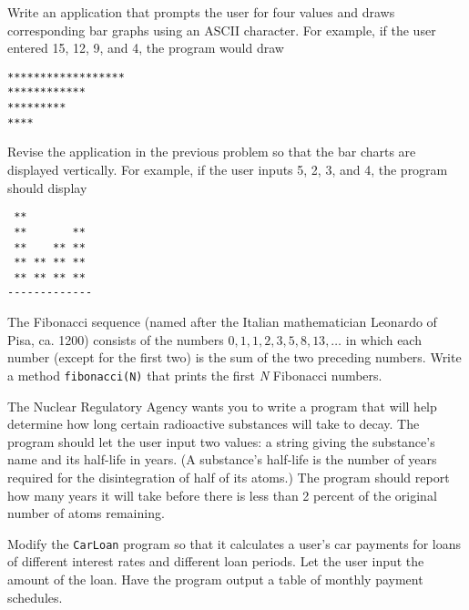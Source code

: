 \begin{EXRtwo}
\item  Write an application that prompts the user for
four values and draws corresponding bar graphs using an
ASCII character. For example, if the user entered
15, 12, 9, and 4, the program would draw

\begin{jjjlisting}
\begin{lstlisting}
******************
************
*********
****
\end{lstlisting}
\end{jjjlisting}

\item  Revise the application in the previous problem so that
the bar charts are displayed vertically. For example, if the
user inputs 5, 2, 3, and 4, the program should display

\begin{jjjlisting}
\begin{lstlisting}
 **
 **       **
 **    ** **
 ** ** ** **
 ** ** ** **
-------------
\end{lstlisting}
\end{jjjlisting}

\item  The Fibonacci sequence
(named after the Italian mathematician Leo\-nardo of Pisa, ca. 1200)
consists of the numbers $0,1,1,2,3,5,8,13,\dots$ in which each number
(except for the first two) is the sum of the two preceding
numbers. Write a method {\tt fibonacci(N)} that prints the first {\it N}
Fibonacci numbers.

\item  The Nuclear Regulatory Agency wants you to write a
program that will help determine how long certain radioactive
substances will take to decay. The program should let the user input
two values: a string giving the substance's name and its half-life in
years. (A substance's half-life is the number of years required for the
disintegration of half of its atoms.) The program should report how
many years it will take before there is less than 2 percent of the
original number of atoms remaining.

\item  Modify the {\tt CarLoan} program so that it calculates a
user's car payments for loans of different interest rates and
different loan periods. Let the user input the amount of the loan.
Have the program output a table of monthly payment schedules.

\end{EXRtwo}

\vspace*{6pt}
